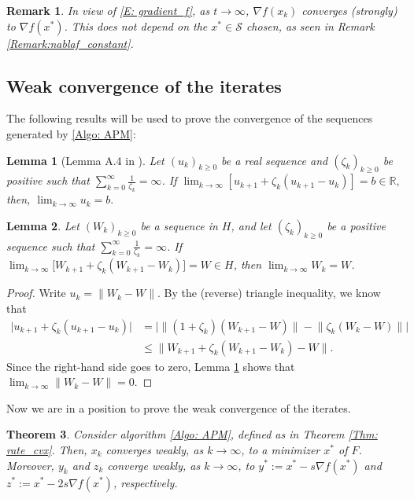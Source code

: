 \documentclass[pdflatex,sn-mathphys-num]{sn-jnl}
\theoremstyle{thmstyleone}
\newtheorem{theorem}{Theorem}
\newtheorem{lemma}[theorem]{Lemma}
\theoremstyle{thmstyletwo}
\newtheorem{remark}{Remark}
\theoremstyle{thmstylethree}
\newcommand{\R}{\mathbb{R}}
\begin{document}
\begin{remark} \label{Rem: grad_converges}
In view of \eqref{E: gradient_f}, as $t\to\infty$, $\nabla f(x_k)$ converges (strongly) to $\nabla f(x^*)$. This does not depend on the $x^*\in\mathcal S$ chosen, as seen in Remark \ref{Remark:nablaf_constant}. 
\end{remark}




\subsection{Weak convergence of the iterates}
The following results will be used to prove the convergence of the sequences generated by \eqref{Algo: APM}:

\begin{lemma}[Lemma A.4 in \cite{Radu_2025}]\label{Lem: convergence_limit}
Let $(u_k)_{k\ge 0}$ be a real sequence and $(\zeta_k)_{k\ge 0}$ be positive such that $\sum_{k=0}^{\infty}\frac{1}{\zeta_k}=\infty$. If
$ \lim_{k\to\infty}[ u_{k+1} + \zeta_k( u_{k+1} - u_k ) ] = b\in\R, $
then,
$ \lim_{k\to\infty}u_k = b. $ 
\end{lemma}


\begin{lemma} \label{Lem: convergence_vector}
Let $(W_k)_{k\ge 0}$ be a sequence in $H$, and let $(\zeta_k)_{k\ge 0}$ be a positive sequence such that $\sum_{k=0}^{\infty}\frac{1}{\zeta_k}=\infty$. If
$\lim_{k\to\infty}\big[W_{k+1} + \zeta_k( W_{k+1} - W_k )\big]=W\in H$, then  $\lim_{k\to\infty}W_k=W$.
\end{lemma}

\begin{proof}
Write $u_k=\|W_k-W\|$. By the (reverse) triangle inequality, we know that
\begin{align*}
    \big|u_{k+1} + \zeta_k( u_{k+1} - u_k )\big| & = \Big|\big\|(1+\zeta_k)(W_{k+1}-W)\|- \big\|\zeta_k (W_k-W)\big\| \Big| \\
    & \le \Big\|W_{k+1} + \zeta_k( W_{k+1} - W_k )-W\Big\|.
\end{align*}
Since the right-hand side goes to zero, Lemma \ref{Lem: convergence_limit} shows that $\lim_{k\to\infty}\|W_k-W\|= 0$.
\end{proof}

Now we are in a position to prove the weak convergence of the iterates.

\begin{theorem}
Consider algorithm \eqref{Algo: APM}, defined as in Theorem \ref{Thm: rate_cvx}. Then, $x_k$ converges weakly, as $k\to\infty$, to a minimizer $x^*$ of $F$. Moreover, $y_k$ and $z_k$ converge weakly, as $k\to\infty$, to $y^*:=x^*-s\nabla f(x^*)$ and $z^*:=x^*-2s\nabla f(x^*)$, respectively.  
\end{theorem}
\end{document}
